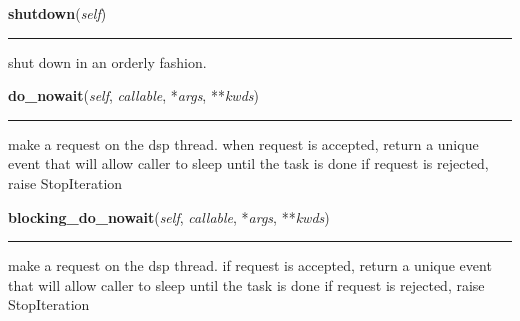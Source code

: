     \label{dsp:DspThread:shutdown}

    \vspace{0.5ex}

    \begin{boxedminipage}{\textwidth}

    \raggedright \textbf{shutdown}(\textit{self})

    \vspace{-1.5ex}

    \rule{\textwidth}{0.5\fboxrule}
    shut down in an orderly fashion.

    \vspace{1ex}

    \end{boxedminipage}

    \label{dsp:DspThread:do_nowait}

    \vspace{0.5ex}

    \begin{boxedminipage}{\textwidth}

    \raggedright \textbf{do\_nowait}(\textit{self}, \textit{callable}, *\textit{args}, **\textit{kwds})

    \vspace{-1.5ex}

    \rule{\textwidth}{0.5\fboxrule}
    make a request on the dsp thread. when request is accepted, return a 
    unique event that will allow caller to sleep until the task is done if 
    request is rejected, raise StopIteration

    \vspace{1ex}

    \end{boxedminipage}

    \label{dsp:DspThread:blocking_do_nowait}

    \vspace{0.5ex}

    \begin{boxedminipage}{\textwidth}

    \raggedright \textbf{blocking\_do\_nowait}(\textit{self}, \textit{callable}, *\textit{args}, **\textit{kwds})

    \vspace{-1.5ex}

    \rule{\textwidth}{0.5\fboxrule}
    make a request on the dsp thread. if request is accepted, return a 
    unique event that will allow caller to sleep until the task is done if 
    request is rejected, raise StopIteration

    \vspace{1ex}

    \end{boxedminipage}

